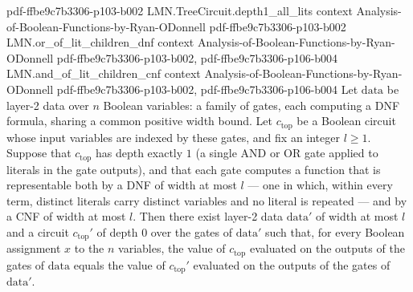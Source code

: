 \begin{lemma}
  {pdf-ffbe9c7b3306-p103-b002}
\proofstep
  {LMN.TreeCircuit.depth1_all_lits}
  {context}
  {Analysis-of-Boolean-Functions-by-Ryan-ODonnell}
  {pdf-ffbe9c7b3306-p103-b002}
\proofstep
  {LMN.or_of_lit_children_dnf}
  {context}
  {Analysis-of-Boolean-Functions-by-Ryan-ODonnell}
  {pdf-ffbe9c7b3306-p103-b002,
    pdf-ffbe9c7b3306-p106-b004}
\proofstep
  {LMN.and_of_lit_children_cnf}
  {context}
  {Analysis-of-Boolean-Functions-by-Ryan-ODonnell}
  {pdf-ffbe9c7b3306-p103-b002,
    pdf-ffbe9c7b3306-p106-b004}
Let $\mathrm{data}$ be layer-2 data over $n$ Boolean variables: a family of gates, each
computing a DNF formula, sharing a common positive width bound. Let $c_{\mathrm{top}}$
be a Boolean circuit whose input variables are indexed by these gates, and fix an
integer $l \ge 1$. Suppose that $c_{\mathrm{top}}$ has depth exactly $1$ (a single AND
or OR gate applied to literals in the gate outputs), and that each gate computes a
function that is representable both by a DNF of width at most $l$ — one in which, within
every term, distinct literals carry distinct variables and no literal is repeated — and
by a CNF of width at most $l$. Then there exist layer-2 data $\mathrm{data}'$ of width
at most $l$ and a circuit $c_{\mathrm{top}}'$ of depth $0$ over the gates of
$\mathrm{data}'$ such that, for every Boolean assignment $x$ to the $n$ variables, the
value of $c_{\mathrm{top}}$ evaluated on the outputs of the gates of $\mathrm{data}$
equals the value of $c_{\mathrm{top}}'$ evaluated on the outputs of the gates of
$\mathrm{data}'$.
\end{lemma}


